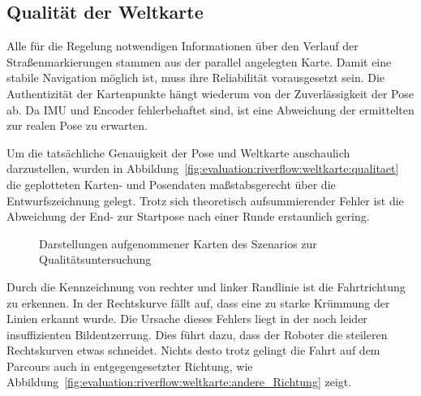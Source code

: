 \subsection{Qualität der Weltkarte  \dcfirstauthorshort}
\label{ssec:evaluation:messungen:weltkarte}
Alle für die Regelung notwendigen Informationen über den Verlauf der Straßenmarkierungen stammen aus der parallel angelegten Karte. Damit eine stabile Navigation möglich ist, muss ihre Reliabilität vorausgesetzt sein. Die Authentizität der Kartenpunkte hängt wiederum von der Zuverlässigkeit der Pose ab. Da IMU und Encoder fehlerbehaftet sind, ist eine Abweichung der ermittelten zur realen Pose zu erwarten. 

Um die tatsächliche Genauigkeit der Pose und Weltkarte anschaulich darzustellen, wurden in Abbildung~\ref{fig:evaluation:riverflow:weltkarte:qualitaet} die geplotteten Karten- und Posendaten maßstabsgerecht über die Entwurfszeichnung gelegt. Trotz sich theoretisch aufsummierender Fehler ist die Abweichung der End- zur Startpose nach einer Runde erstaunlich gering.

\begin{figure}[htbp] %
	\centering
	
	\hfill
	\caption{Darstellungen aufgenommener Karten des Szenarios zur Qualitätsuntersuchung}
	
\end{figure} 

Durch die Kennzeichnung von rechter und linker Randlinie ist die Fahrtrichtung zu erkennen. In der Rechtskurve fällt auf, dass eine zu starke Krümmung der Linien erkannt wurde. Die Ursache dieses Fehlers liegt in der noch leider insuffizienten Bildentzerrung. Dies führt dazu, dass der Roboter die steileren Rechtskurven etwas schneidet. Nichts desto trotz gelingt die Fahrt auf dem Parcours auch in entgegengesetzter Richtung, wie Abbildung~\ref{fig:evaluation:riverflow:weltkarte:andere_Richtung} zeigt.